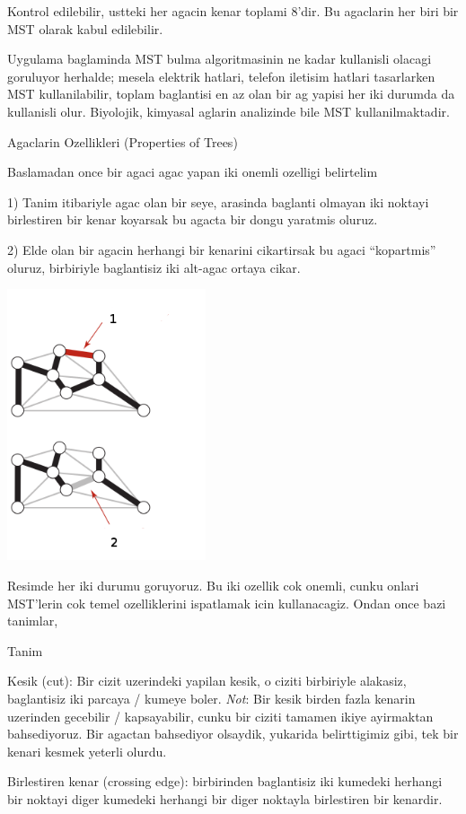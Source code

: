 \documentclass[12pt,fleqn]{article}\usepackage{../common}
\begin{document}
Kontrol edilebilir, ustteki her agacin kenar toplami 8'dir. Bu agaclarin
her biri bir MST olarak kabul edilebilir.

Uygulama baglaminda MST bulma algoritmasinin ne kadar kullanisli olacagi
goruluyor herhalde; mesela elektrik hatlari, telefon iletisim hatlari
tasarlarken MST kullanilabilir, toplam baglantisi en az olan bir ag yapisi
her iki durumda da kullanisli olur. Biyolojik, kimyasal aglarin analizinde
bile MST kullanilmaktadir.

Agaclarin Ozellikleri (Properties of Trees)

Baslamadan once bir agaci agac yapan iki onemli ozelligi belirtelim

1) Tanim itibariyle agac olan bir seye, arasinda baglanti olmayan iki
noktayi birlestiren bir kenar koyarsak bu agacta bir dongu yaratmis
oluruz.

2) Elde olan bir agacin herhangi bir kenarini cikartirsak bu agaci
``kopartmis'' oluruz, birbiriyle baglantisiz iki alt-agac ortaya cikar.

\includegraphics[height=8cm]{graph_prop.png}

Resimde her iki durumu goruyoruz. Bu iki ozellik cok onemli, cunku onlari
MST'lerin cok temel ozelliklerini ispatlamak icin kullanacagiz. Ondan once
bazi tanimlar,

Tanim

Kesik (cut): Bir cizit uzerindeki yapilan kesik, o ciziti birbiriyle
alakasiz, baglantisiz iki parcaya / kumeye boler. {\em Not}: Bir kesik
birden fazla kenarin uzerinden gecebilir / kapsayabilir, cunku bir ciziti
tamamen ikiye ayirmaktan bahsediyoruz. Bir agactan bahsediyor olsaydik,
yukarida belirttigimiz gibi, tek bir kenari kesmek yeterli olurdu.

Birlestiren kenar (crossing edge): birbirinden baglantisiz iki kumedeki
herhangi bir noktayi diger kumedeki herhangi bir diger noktayla birlestiren
bir kenardir.
\end{document}
